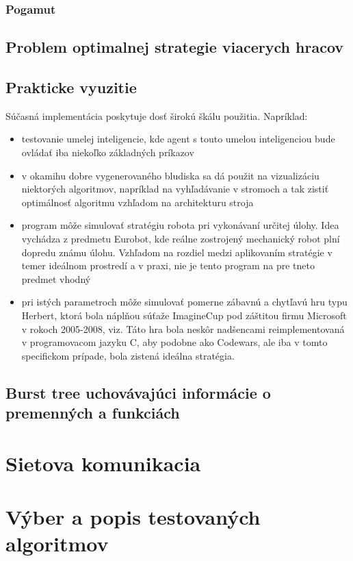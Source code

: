 \documentclass[12pt,notitlepage]{report}
\begin{document}
\subsection {Pogamut}
\section{Problem optimalnej strategie viacerych hracov}
\section{Prakticke vyuzitie}
Súčasná implementácia poskytuje dosť širokú škálu použitia. Napríklad:\\
	\begin{itemize}
	\item testovanie umelej inteligencie, kde agent s touto umelou inteligenciou bude ovládať iba niekoľko základných príkazov
	\item v okamihu dobre vygenerovaného bludiska sa dá použit na vizualizáciu niektorých algoritmov, napríklad na vyhľadávanie v stromoch a tak zistiť optimálnosť algoritmu vzhľadom na architekturu stroja
	\item program môže simulovať stratégiu robota pri vykonávaní určitej úlohy. Idea vychádza z predmetu Eurobot, kde reálne zostrojený mechanický robot plní dopredu známu úlohu. Vzhľadom na rozdiel medzi aplikovaním stratégie v temer ideálnom prostredí a v praxi, nie je tento program na pre tneto predmet vhodný
	\item pri istých parametroch môže simulovať pomerne zábavnú a chytľavú hru typu Herbert, ktorá bola náplňou súťaže ImagineCup pod záštitou firmu Microsoft v rokoch 2005-2008, viz\cite{imaginecup}. Táto hra bola neskôr nadšencami reimplementovaná v programovacom jazyku C, aby podobne ako Codewars, ale iba v tomto specifickom prípade, bola zistená ideálna stratégia. %
	\end{itemize}


\section {Burst tree uchovávajúci informácie o premenných a funkciách} 
\chapter{Sietova komunikacia}
\chapter{Výber a popis testovaných algoritmov}
\end{document}
